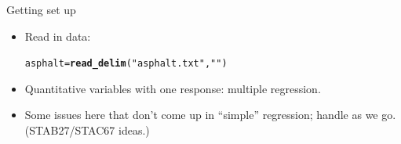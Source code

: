 \documentclass[unknownkeysallowed]{beamer}\usepackage[]{graphicx}\usepackage[]{color}
\makeatletter
\newcommand{\hlstr}[1]{\textcolor[rgb]{0.192,0.494,0.8}{#1}}%
\newcommand{\hlstd}[1]{\textcolor[rgb]{0.345,0.345,0.345}{#1}}%
\newcommand{\hlkwb}[1]{\textcolor[rgb]{0.69,0.353,0.396}{#1}}%
\newcommand{\hlkwd}[1]{\textcolor[rgb]{0.737,0.353,0.396}{\textbf{#1}}}%
\newenvironment{kframe}{%
 \def\at@end@of@kframe{}%
 \ifinner\ifhmode%
  \def\at@end@of@kframe{\end{minipage}}%
  \begin{minipage}{\columnwidth}%
 \fi\fi%
 \def\FrameCommand##1{\hskip\@totalleftmargin \hskip-\fboxsep
 \colorbox{shadecolor}{##1}\hskip-\fboxsep
     \hskip-\linewidth \hskip-\@totalleftmargin \hskip\columnwidth}%
 \MakeFramed {\advance\hsize-\width
   \@totalleftmargin\z@ \linewidth\hsize
   \@setminipage}}%
 {\par\unskip\endMakeFramed%
 \at@end@of@kframe}
\newenvironment{knitrout}{}{} %
\makeatother
\begin{document}
\begin{frame}[fragile]{Getting set up}

  \begin{itemize}
  \item Read in data:

\begin{knitrout}
\color{fgcolor}\begin{kframe}
\begin{alltt}
\hlstd{asphalt}\hlkwb{=}\hlkwd{read_delim}\hlstd{(}\hlstr{"asphalt.txt"}\hlstd{,}\hlstr{" "}\hlstd{)}
\end{alltt}


{\ttfamily\noindent\itshape\color{messagecolor}{\#\# Parsed with column specification:\\\#\# cols(\\\#\#\ \  pct.a.surf = col\_double(),\\\#\#\ \  pct.a.base = col\_double(),\\\#\#\ \  fines = col\_double(),\\\#\#\ \  voids = col\_double(),\\\#\#\ \  rut.depth = col\_double(),\\\#\#\ \  viscosity = col\_double(),\\\#\#\ \  run = col\_integer()\\\#\# )}}\end{kframe}
\end{knitrout}


\item Quantitative variables with one response: multiple regression.
\item Some issues here that don't come up in ``simple'' regression;
  handle as we go. (STAB27/STAC67 ideas.)

  \end{itemize}

\end{frame}
\end{document}
